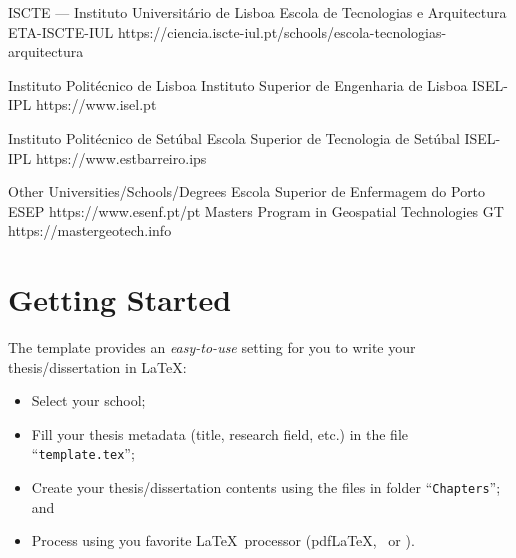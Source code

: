 \begin{ntUniversity}{ISCTE — Instituto Universitário de Lisboa}
             {Escola de Tecnologias e Arquitectura}%
             {ETA-ISCTE-IUL}%
             {https://ciencia.iscte-iul.pt/schools/escola-tecnologias-arquitectura}%
\end{ntUniversity}

\begin{ntUniversity}{Instituto Politécnico de Lisboa}
             {Instituto Superior de Engenharia de Lisboa}%
             {ISEL-IPL}%
             {https://www.isel.pt}%
\end{ntUniversity}

\begin{ntUniversity}{Instituto Politécnico de Setúbal}
             {Escola Superior de Tecnologia de Setúbal}%
             {ISEL-IPL}%
             {https://www.estbarreiro.ips}%
\end{ntUniversity}

\begin{ntUniversity}{Other Universities/Schools/Degrees}
             {Escola Superior de Enfermagem do Porto}%
             {ESEP}%
             {https://www.esenf.pt/pt}%
             {Masters Program in Geospatial Technologies}%
             {GT}%
             {https://mastergeotech.info}%
\end{ntUniversity}


\section{Getting Started}
\label{sec:getting_started}

The template provides an \emph{easy-to-use} setting for you to write your thesis/dissertation in \LaTeX:
\begin{itemize}
  \item  Select your school;
  \item Fill your thesis metadata (title, research field, etc.) in the file “\texttt{template.tex}”;
  \item Create your thesis/dissertation contents using the files in folder “\texttt{Chapters}”; and
  \item Process using you favorite \LaTeX\ processor (pdf\LaTeX, \XeLaTeX\ or \LuaLaTeX).
\end{itemize}


